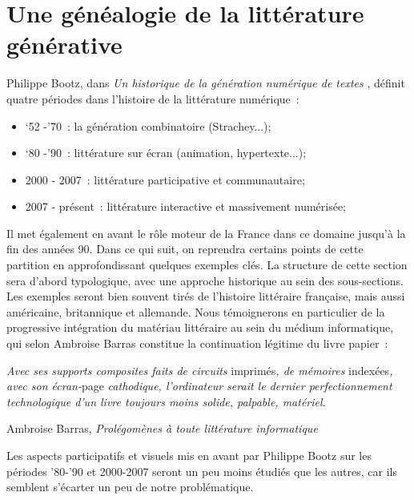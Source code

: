 \documentclass{article}
\newenvironment{citationbox}
{\begin{center}
		\begin{minipage}{.8\textwidth}
		}
		{
		\end{minipage}	
\end{center}
}
\begin{document}
	\section{Une généalogie de la littérature générative}\label{genealogie}
		Philippe Bootz, dans \textit{Un historique de la génération numérique de textes} \autocite{bootz}, définit quatre périodes dans l'histoire de la littérature numérique :
		\vspace{2mm}
		\begin{itemize}
			\item ‘52 -'70 : la génération combinatoire (Strachey...);
			\item ‘80 -'90 : littérature sur écran (animation, hypertexte...);
			\item 2000 - 2007 : littérature participative et communautaire;
			\item 2007 - présent : littérature interactive et massivement numérisée;
		\end{itemize}
		\vspace{2mm}
		Il met également en avant le rôle moteur de la France dans ce domaine jusqu'à la fin des années 90. Dans ce qui suit, on reprendra certains points de cette partition en approfondissant quelques exemples clés. La structure de cette section sera d'abord typologique, avec une approche historique au sein des sous-sections. Les exemples seront  bien souvent tirés de l'histoire littéraire française, mais aussi américaine, britannique et allemande. Nous témoignerons en particulier de la progressive intégration du matériau littéraire au sein du médium informatique, qui selon Ambroise Barras constitue la continuation légitime du livre papier~:
		\begin{citationbox}
			\textit{Avec ses
			supports composites faits de circuits} imprimés\textit{, de mémoires }indexées\textit{,
			avec son écran-}page \textit{cathodique, l'ordinateur serait le dernier
			perfectionnement technologique d'un livre toujours moins solide, palpable,
			matériel.}
			\begin{flushright}
				Ambroise Barras, \textit{Prolégomènes à toute littérature informatique} \autocite{barras1995}
			\end{flushright}
		\end{citationbox}
		
		 Les aspects participatifs et visuels mis en avant par Philippe Bootz sur les périodes '80-'90 et 2000-2007 seront un peu moins étudiés que les autres, car ils semblent s'écarter un peu de notre problématique.
\end{document}

